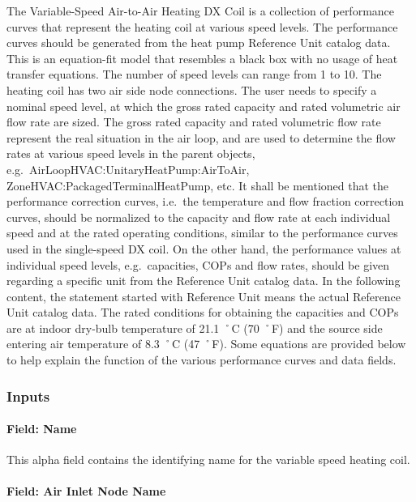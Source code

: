 The Variable-Speed Air-to-Air Heating DX Coil is a collection of performance curves that represent the heating coil at various speed levels. The performance curves should be generated from the heat pump Reference Unit catalog data. This is an equation-fit model that resembles a black box with no usage of heat transfer equations. The number of speed levels can range from 1 to 10. The heating coil has two air side node connections. The user needs to specify a nominal speed level, at which the gross rated capacity and rated volumetric air flow rate are sized. The gross rated capacity and rated volumetric flow rate represent the real situation in the air loop, and are used to determine the flow rates at various speed levels in the parent objects, e.g.~AirLoopHVAC:UnitaryHeatPump:AirToAir, ZoneHVAC:PackagedTerminalHeatPump, etc. It shall be mentioned that the performance correction curves, i.e.~the temperature and flow fraction correction curves, should be normalized to the capacity and flow rate at each individual speed and at the rated operating conditions, similar to the performance curves used in the single-speed DX coil. On the other hand, the performance values at individual speed levels, e.g.~capacities, COPs and flow rates, should be given regarding a specific unit from the Reference Unit catalog data. In the following content, the statement started with Reference Unit means the actual Reference Unit catalog data. The rated conditions for obtaining the capacities and COPs are at indoor dry-bulb temperature of 21.1 ˚C (70 ˚F) and the source side entering air temperature of 8.3 ˚C (47 ˚F). Some equations are provided below to help explain the function of the various performance curves and data fields.

\subsubsection{Inputs}\label{inputs-21-001}

\paragraph{Field: Name}\label{field-name-20-000}

This alpha field contains the identifying name for the variable speed heating coil.

\paragraph{Field: Air Inlet Node Name}\label{field-air-inlet-node-name-15}

